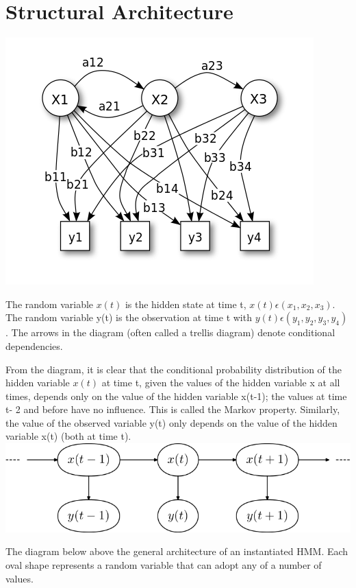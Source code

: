 \documentclass{article}
\begin{document}
\section*{Structural Architecture}

\includegraphics[scale=.4]{image}

The random variable $ x(t)$ is the hidden state at time t, $ x(t) \epsilon ({ x_1, x_2, x_3 })$. The random variable y(t) is the observation at time t with $y(t) \epsilon ({ y_1, y_2, y_3, y_4 })$. The arrows in the diagram (often called a trellis diagram) denote conditional dependencies.

From the diagram, it is clear that the conditional probability distribution of the hidden variable $x(t)$ at time t, given the values of the hidden variable x at all times, depends only on the value of the hidden variable x(t-1); the values at time t- 2 and before have no influence. This is called the Markov property. Similarly, the value of the observed variable y(t) only depends on the value of the hidden variable x(t) (both at time t). \\

\includegraphics[scale=.4]{image2}

The diagram below above the general architecture of an instantiated HMM. Each oval shape represents a random variable that can adopt any of a number of values.
\end{document}
